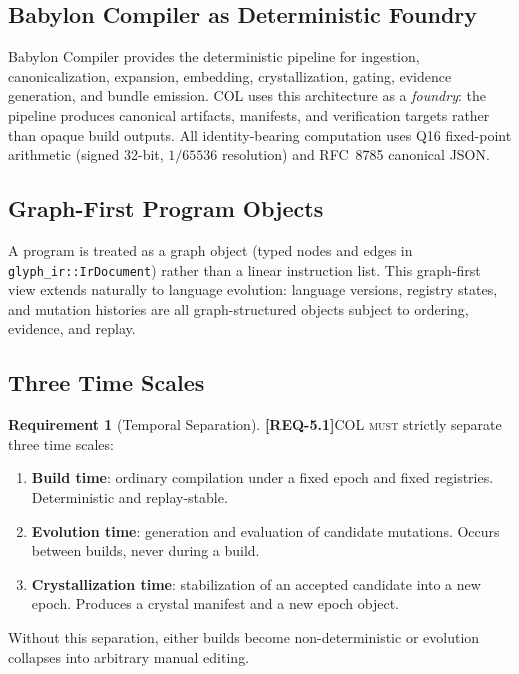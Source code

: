 \documentclass[11pt,a4paper,twoside]{article}
\theoremstyle{definition}
\newtheorem{requirement}{Requirement}[section]
\theoremstyle{remark}
\newcommand{\req}[1]{\textbf{\textcolor{reqred}{[REQ-#1]}}}
\newcommand{\must}{\textsc{must}}
\begin{document}
\subsection{Babylon Compiler as Deterministic Foundry}

Babylon Compiler provides the deterministic pipeline for ingestion, canonicalization, expansion, embedding, crystallization, gating, evidence generation, and bundle emission. COL uses this architecture as a \emph{foundry}: the pipeline produces canonical artifacts, manifests, and verification targets rather than opaque build outputs. All identity-bearing computation uses Q16 fixed-point arithmetic (signed 32-bit, $1/65536$ resolution) and RFC~8785 canonical JSON.

\subsection{Graph-First Program Objects}

A program is treated as a graph object (typed nodes and edges in \texttt{glyph\_ir::IrDocument}) rather than a linear instruction list. This graph-first view extends naturally to language evolution: language versions, registry states, and mutation histories are all graph-structured objects subject to ordering, evidence, and replay.

\subsection{Three Time Scales}
\label{sec:timescales}

\begin{requirement}[Temporal Separation]
\label{req:timescales}
\req{5.1}\quad COL \must{} strictly separate three time scales:
\begin{enumerate}[label=(\roman*)]
  \item \textbf{Build time}: ordinary compilation under a fixed epoch and fixed registries. Deterministic and replay-stable.
  \item \textbf{Evolution time}: generation and evaluation of candidate mutations. Occurs between builds, never during a build.
  \item \textbf{Crystallization time}: stabilization of an accepted candidate into a new epoch. Produces a crystal manifest and a new epoch object.
\end{enumerate}
Without this separation, either builds become non-deterministic or evolution collapses into arbitrary manual editing.
\end{requirement}
\end{document}
